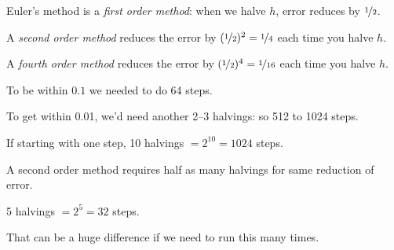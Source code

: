 \documentclass[10pt,aspectratio=169]{beamer}
\begin{document}
\begin{frame}

Euler's method is a \emph{first order method}:
when we halve $h$, error reduces by $\nicefrac{1}{2}$.

\medskip
\pause

A \emph{second order method} reduces the error by
$(\nicefrac{1}{2})^2 = \nicefrac{1}{4}$ each time you halve $h$.

\medskip
\pause

A \emph{fourth order method} reduces the error by
$(\nicefrac{1}{2})^4 = \nicefrac{1}{16}$ each time you halve $h$.

\medskip
\pause

To be within $0.1$ we needed to do 64 steps.

\medskip
\pause

To get within 0.01, we'd need another 2--3 halvings: so 512 to 1024 steps.

\medskip
\pause

If starting with one step, 10 halvings ${} = 2^{10} = 1024$ steps.

\medskip
\pause

A second order method requires half as many halvings for same
reduction of error.

\medskip
\pause

5 halvings ${} = 2^{5} = 32$ steps.

\medskip
\pause

That can be a huge difference if we need to run this many times.
\end{frame}
\end{document}
